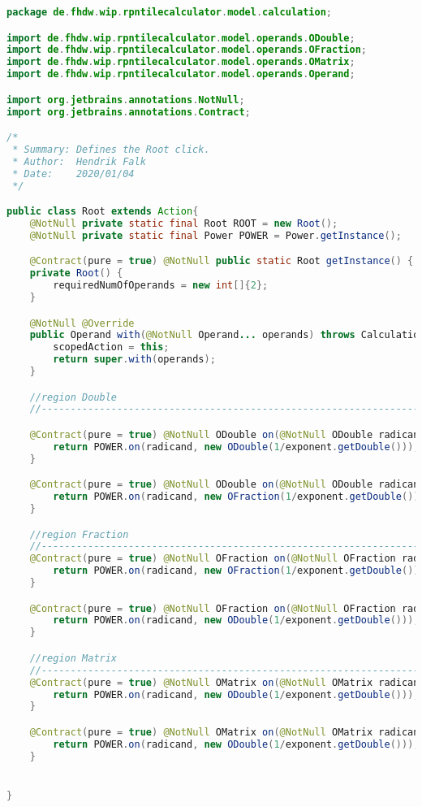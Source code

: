\begin{lstlisting}[caption=Root (Falk),label=list:Root,language=Java]
package de.fhdw.wip.rpntilecalculator.model.calculation;

import de.fhdw.wip.rpntilecalculator.model.operands.ODouble;
import de.fhdw.wip.rpntilecalculator.model.operands.OFraction;
import de.fhdw.wip.rpntilecalculator.model.operands.OMatrix;
import de.fhdw.wip.rpntilecalculator.model.operands.Operand;

import org.jetbrains.annotations.NotNull;
import org.jetbrains.annotations.Contract;

/*
 * Summary: Defines the Root click.
 * Author:  Hendrik Falk
 * Date:    2020/01/04
 */

public class Root extends Action{
    @NotNull private static final Root ROOT = new Root();
    @NotNull private static final Power POWER = Power.getInstance();

    @Contract(pure = true) @NotNull public static Root getInstance() { return ROOT; }
    private Root() {
        requiredNumOfOperands = new int[]{2};
    }

    @NotNull @Override
    public Operand with(@NotNull Operand... operands) throws CalculationException {
        scopedAction = this;
        return super.with(operands);
    }

    //region Double
    //------------------------------------------------------------------------------------

    @Contract(pure = true) @NotNull ODouble on(@NotNull ODouble radicand, @NotNull ODouble exponent) {
        return POWER.on(radicand, new ODouble(1/exponent.getDouble()));
    }

    @Contract(pure = true) @NotNull ODouble on(@NotNull ODouble radicand, @NotNull OFraction exponent){
        return POWER.on(radicand, new OFraction(1/exponent.getDouble()));
    }

    //region Fraction
    //------------------------------------------------------------------------------------
    @Contract(pure = true) @NotNull OFraction on(@NotNull OFraction radicand, @NotNull ODouble exponent){
        return POWER.on(radicand, new OFraction(1/exponent.getDouble()));
    }

    @Contract(pure = true) @NotNull OFraction on(@NotNull OFraction radicand, @NotNull OFraction exponent){
        return POWER.on(radicand, new ODouble(1/exponent.getDouble()));
    }

    //region Matrix
    //------------------------------------------------------------------------------------
    @Contract(pure = true) @NotNull OMatrix on(@NotNull OMatrix radicand, @NotNull ODouble exponent) {
        return POWER.on(radicand, new ODouble(1/exponent.getDouble()));
    }

    @Contract(pure = true) @NotNull OMatrix on(@NotNull OMatrix radicand, @NotNull OFraction exponent) {
        return POWER.on(radicand, new ODouble(1/exponent.getDouble()));
    }


}
\end{lstlisting}    


